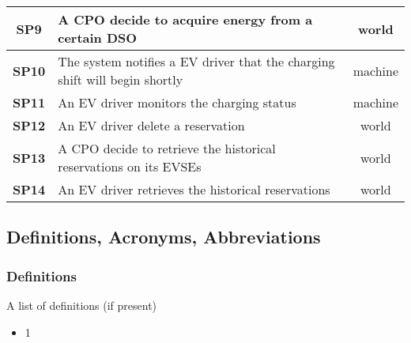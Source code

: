 \begin{table}[H]
\begin{tabularx}{\textwidth}{c|X|c}
        \textbf{SP9}  & A CPO decide to acquire energy from a certain DSO                                                                                                                     & world         \\ \midrule
        \textbf{SP10} & The system notifies a EV driver that the charging shift will begin shortly                                                                                            & machine       \\ \midrule
        \textbf{SP11} & An EV driver monitors the charging status                                                                                                                             & machine       \\ \midrule
        \textbf{SP12} & An EV driver delete a reservation                                                                                                                                     & world         \\ \midrule
        \textbf{SP13} & A CPO decide to retrieve the historical reservations on its EVSEs                                                                                                     & world         \\ \midrule
        \textbf{SP14} & An EV driver retrieves the historical reservations                                                                                                                    & world         \\ \bottomrule
    \end{tabularx}
\end{table}


\subsection{Definitions, Acronyms, Abbreviations}
\subsubsection*{Definitions}
A list of definitions (if present)
\begin{itemize}
    \item 1
\end{itemize}
